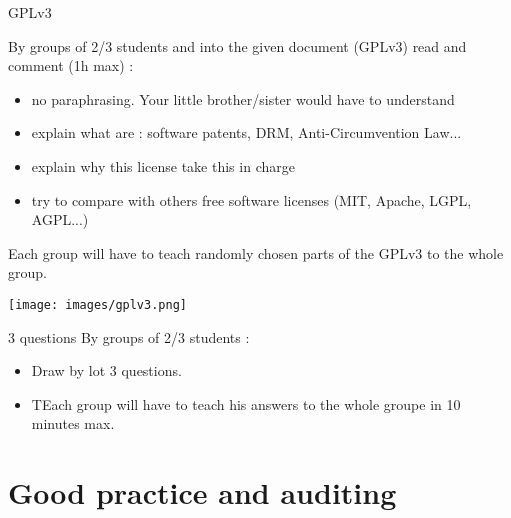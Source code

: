 \documentclass{beamer}
\begin{document}
\begin{frame}{GPLv3}

  By groups of 2/3 students and into the given document (GPLv3) read and comment (1h max) :
  \begin{itemize}
    \item no paraphrasing. Your little brother/sister would have to understand
    \item explain what are : software patents, DRM, Anti-Circumvention Law...
    \item explain why this license take this in charge
    \item try to compare with others free software licenses (MIT, Apache, LGPL, AGPL...)
   \end{itemize}
   
  Each group will have to teach randomly chosen parts of the GPLv3 to the whole group.

  \begin{center}
    \texttt{[image: images/gplv3.png]}
\end{center}
\end{frame}

\begin{frame}{3 questions}
 By groups of 2/3 students :
 \begin{itemize}
 \item Draw by lot 3 questions.
 \item TEach group will have to teach his answers to the whole groupe in 10 minutes max.
  \end{itemize}

\end{frame}


\section{Good practice and auditing}
\end{document}
